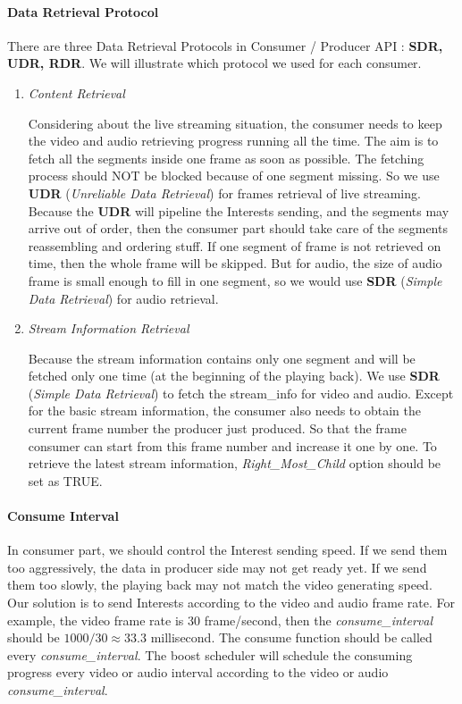 \paragraph{Data Retrieval Protocol}
\label{par:ndnlive_dataretrievalprotocol}
\vspace{0.3cm}
There are three Data Retrieval Protocols in Consumer / Producer API : \textbf{SDR, UDR, RDR}. We will illustrate which protocol we used for each consumer.
\begin{enumerate}
	\item {\textit{Content Retrieval}}
	
	Considering about the live streaming situation, the consumer needs to keep the video and audio retrieving progress running all the time. The aim is to fetch all the segments inside one frame as soon as possible. The fetching process should NOT be blocked because of one segment missing. So we use \textbf{UDR} (\textit{Unreliable Data Retrieval}) for frames retrieval of live streaming. Because the \textbf{UDR} will pipeline the Interests sending, and the segments may arrive out of order, then the consumer part should take care of the segments reassembling and ordering stuff. If one segment of frame is not retrieved on time, then the whole frame will be skipped. But for audio, the size of audio frame is small enough to fill in one segment, so we would use \textbf{SDR} (\textit{Simple Data Retrieval}) for audio retrieval.

	\item {\textit{Stream Information Retrieval}} %
	
	Because the stream information contains only one segment and will be fetched only one time (at the beginning of the playing back). We use \textbf{SDR} (\textit{Simple Data Retrieval}) to fetch the stream\_info for video and audio. Except for the basic stream information, the consumer also needs to obtain the current frame number the producer just produced. So that the frame consumer can start from this frame number and increase it one by one. To retrieve the latest stream information, \textit{Right\_Most\_Child} option should be set as TRUE.
\end{enumerate}

\paragraph{Consume Interval} %
\label{par:consume_interval}
\vspace{0.3cm}
In consumer part, we should control the Interest sending speed. If we send them too aggressively, the data in producer side may not get ready yet. If we send them too slowly, the playing back may not match the video generating speed. Our solution is to send Interests according to the video and audio frame rate. For example, the video frame rate is 30 frame/second, then the \textit{consume\_interval} should be $1000/30 \approx {33.3}$ millisecond. The consume function should be called every \textit{consume\_interval}.
The boost scheduler will schedule the consuming progress every video or audio interval according to the video or audio \textit{consume\_interval}. 
